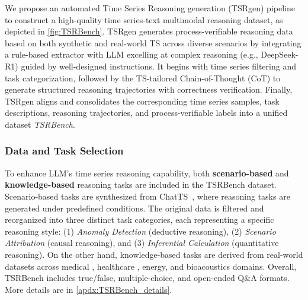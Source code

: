 \documentclass{article}
\theoremstyle{plain}
\theoremstyle{definition}
\theoremstyle{remark}
\begin{document}
We propose an automated  Time Series Reasoning generation (TSRgen) pipeline to construct a high-quality time series-text multimodal reasoning dataset, as depicted in \autoref{fig:TSRBench}. TSRgen generates process-verifiable reasoning data based on both synthetic and real-world TS across diverse scenarios by integrating a rule-based extractor with LLM excelling at complex reasoning (e.g., DeepSeek-R1) guided by well-designed instructions. It begins with time series filtering and task categorization, followed by the TS-tailored Chain-of-Thought (CoT) to generate structured reasoning trajectories with correctness verification. Finally, TSRgen aligns and consolidates the corresponding time series samples, task descriptions, reasoning trajectories, and process-verifiable labels into a unified dataset \textit{TSRBench}.

\subsubsection{Data and Task Selection} 

To enhance LLM's time series reasoning capability, both \textbf{scenario-based} and \textbf{knowledge-based} reasoning tasks are included in the TSRBench dataset. Scenario-based tasks are synthesized from ChatTS~\cite{xie2025chatts}, where reasoning tasks are generated under predefined conditions. The original data is filtered and reorganized into three distinct task categories, each representing a specific reasoning style: (1) \textit{Anomaly Detection} (deductive reasoning), (2) \textit{Scenario Attribution} (causal reasoning), and (3) \textit{Inferential Calculation} (quantitative reasoning). On the other hand, knowledge-based tasks are derived from real-world datasets across medical \cite{ECG}, healthcare \cite{EMG}, energy, and bioacoustics \cite{RCW} domains. Overall, TSRBench includes true/false, multiple-choice, and open-ended Q\&A formats. More details are in \autoref{apdx:TSRBench_details}.
\end{document}
